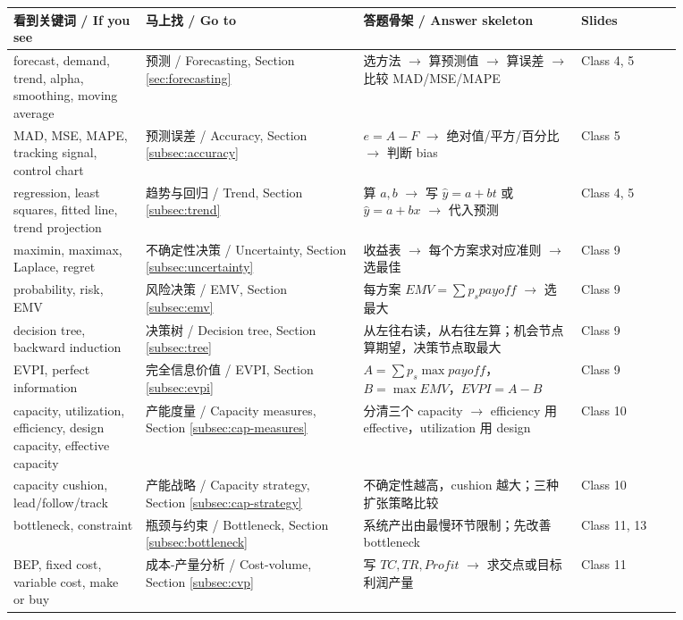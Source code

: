 \documentclass[10pt,a4paper]{ctexart}
\begin{document}
{\footnotesize
\setlength{\tabcolsep}{3pt}
\begin{longtable}{@{}L{0.17\linewidth}L{0.28\linewidth}L{0.29\linewidth}L{0.13\linewidth}@{}}
\toprule
\textbf{看到关键词 / If you see} & \textbf{马上找 / Go to} & \textbf{答题骨架 / Answer skeleton} & \textbf{Slides} \\
\midrule
forecast, demand, trend, alpha, smoothing, moving average & 预测 / Forecasting, Section \ref{sec:forecasting} & 选方法 $\rightarrow$ 算预测值 $\rightarrow$ 算误差 $\rightarrow$ 比较 MAD/MSE/MAPE & Class 4, 5 \\
MAD, MSE, MAPE, tracking signal, control chart & 预测误差 / Accuracy, Section \ref{subsec:accuracy} & $e=A-F$ $\rightarrow$ 绝对值/平方/百分比 $\rightarrow$ 判断 bias & Class 5 \\
regression, least squares, fitted line, trend projection & 趋势与回归 / Trend, Section \ref{subsec:trend} & 算 $a,b$ $\rightarrow$ 写 $\hat{y}=a+bt$ 或 $\hat{y}=a+bx$ $\rightarrow$ 代入预测 & Class 4, 5 \\
maximin, maximax, Laplace, regret & 不确定性决策 / Uncertainty, Section \ref{subsec:uncertainty} & 收益表 $\rightarrow$ 每个方案求对应准则 $\rightarrow$ 选最佳 & Class 9 \\
probability, risk, EMV & 风险决策 / EMV, Section \ref{subsec:emv} & 每方案 $EMV=\sum p_s payoff$ $\rightarrow$ 选最大 & Class 9 \\
decision tree, backward induction & 决策树 / Decision tree, Section \ref{subsec:tree} & 从左往右读，从右往左算；机会节点算期望，决策节点取最大 & Class 9 \\
EVPI, perfect information & 完全信息价值 / EVPI, Section \ref{subsec:evpi} & $A=\sum p_s \max payoff$，$B=\max EMV$，$EVPI=A-B$ & Class 9 \\
capacity, utilization, efficiency, design capacity, effective capacity & 产能度量 / Capacity measures, Section \ref{subsec:cap-measures} & 分清三个 capacity $\rightarrow$ efficiency 用 effective，utilization 用 design & Class 10 \\
capacity cushion, lead/follow/track & 产能战略 / Capacity strategy, Section \ref{subsec:cap-strategy} & 不确定性越高，cushion 越大；三种扩张策略比较 & Class 10 \\
bottleneck, constraint & 瓶颈与约束 / Bottleneck, Section \ref{subsec:bottleneck} & 系统产出由最慢环节限制；先改善 bottleneck & Class 11, 13 \\
BEP, fixed cost, variable cost, make or buy & 成本-产量分析 / Cost-volume, Section \ref{subsec:cvp} & 写 $TC,TR,Profit$ $\rightarrow$ 求交点或目标利润产量 & Class 11 \\

\end{longtable}}
\end{document}
